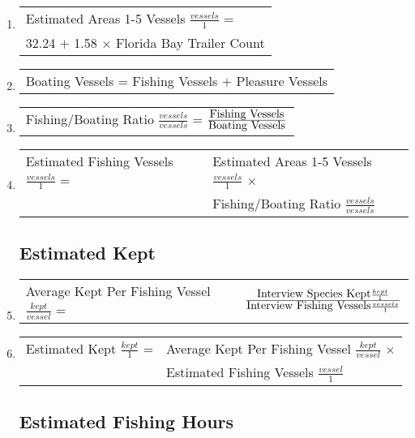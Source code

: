 \documentclass[letterpaper,12pt]{article}
\newcommand{\hspacer}{\hspace*{1cm}}
\newcommand{\fraction}[1]{\textrm{\normalsize{#1}}}
\begin{document}
\begin{enumerate}

\item
\begin{tabular}{l@{ }}
	Estimated Areas 1-5 Vessels 
		$ \frac {vessels} {1} $ = \\
		\hspacer 32.24 $+$
		1.58 $\times$ Florida Bay Trailer Count
\end{tabular}

\item
\begin{tabular}{l@{ }}
	Boating Vessels = Fishing Vessels $+$ Pleasure Vessels
\end{tabular}

\item
\begin{tabular}{l@{ }}
	Fishing/Boating Ratio 
		$ \frac {vessels} {vessels} $ =
		$
\frac
	{\fraction{Fishing Vessels}}
      	{\fraction{Boating Vessels}}
		$
\end{tabular}

\item
\begin{tabular}{l@{ }l@{ }}
	Estimated Fishing Vessels 
		$ \frac {vessels} {1} $ =
		& Estimated Areas 1-5 Vessels
			$ \frac {vessels} {1} $ $\times$ \\
		& Fishing/Boating Ratio
			$ \frac {vessels} {vessels} $
\end{tabular}

\subsection{Estimated Kept}

\item
\begin{tabular}{l@{ }l@{ }}
	Average Kept Per Fishing Vessel
		$ \frac {kept} {vessel} $ =
		& $ \frac	{\fraction{Interview Species Kept}
				 \frac {kept} {1}}
				{\fraction{Interview Fishing Vessels}
				 \frac {vessels} {1}} $
\end{tabular}

\item
\begin{tabular}{l@{ }l@{ }}
	Estimated Kept $ \frac {kept} {1} $ =
		& Average Kept Per Fishing Vessel
			$ \frac {kept} {vessel} $ $\times$ \\
		& Estimated Fishing Vessels
			$ \frac {vessel} {1} $
\end{tabular}

\subsection{Estimated Fishing Hours}


\end{enumerate}
\end{document}
